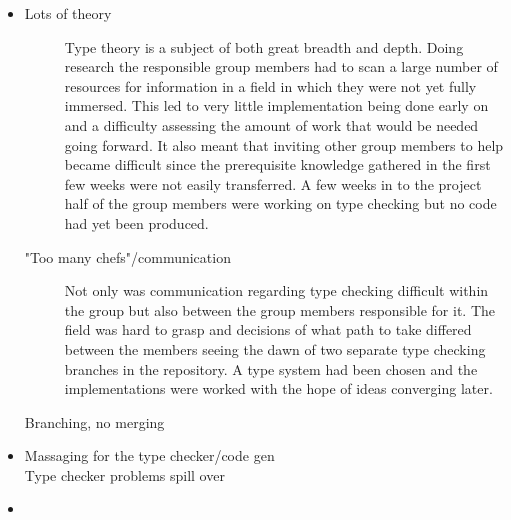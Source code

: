 \begin{itemize}
  \item {}
  \begin{description}
    \item[Lots of theory]
      Type theory is a subject of both great breadth and depth. Doing research the responsible group members had to scan a large number of resources for information in a field in which they were not yet fully immersed. This led to very little implementation being done early on and a difficulty assessing the amount of work that would be needed going forward. It also meant that inviting other group members to help became difficult since the prerequisite knowledge gathered in the first few weeks were not easily transferred. A few weeks in to the project half of the group members were working on type checking but no code had yet been produced.
    \item["Too many chefs"/communication]
      Not only was communication regarding type checking difficult within the group but also between the group members responsible for it. The field was hard to grasp and decisions of what path to take differed between the members seeing the dawn of two separate type checking branches in the repository. A type system had been chosen and the implementations were worked with the hope of ideas converging later.
    \item[Branching, no merging]
  \end{description}

  \item {}

  \begin{description}
    \item[Massaging for the type checker/code gen]
    \item[Type checker problems spill over]
  \end{description}
  \item {}

\end{itemize}
